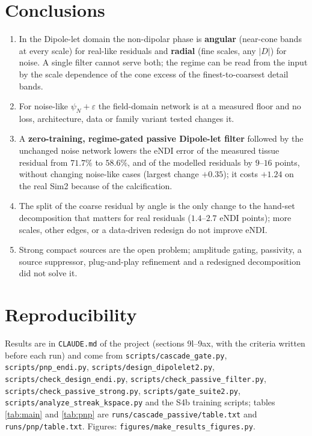 \documentclass[11pt]{article}
\newcommand{\abs}[1]{\lvert #1\rvert}
\newcommand{\code}[1]{\texttt{#1}}
\begin{document}
\section{Conclusions}
\begin{enumerate}[leftmargin=1.5em,itemsep=2pt]
\item In the Dipole-let domain the non-dipolar phase is \textbf{angular} (near-cone bands at every scale) for real-like residuals and \textbf{radial} (fine scales, any $\abs D$) for noise. A single filter cannot serve both; the regime can be read from the input by the scale dependence of the cone excess of the finest-to-coarsest detail bands.
\item For noise-like $\psi_N+\varepsilon$ the field-domain network is at a measured floor and no loss, architecture, data or family variant tested changes it.
\item A \textbf{zero-training, regime-gated passive Dipole-let filter} followed by the unchanged noise network lowers the eNDI error of the measured tissue residual from $71.7\%$ to $58.6\%$, and of the modelled residuals by $9$--$16$ points, without changing noise-like cases (largest change $+0.35$); it costs $+1.24$ on the real Sim2 because of the calcification.
\item The split of the coarse residual by angle is the only change to the hand-set decomposition that matters for real residuals ($1.4$--$2.7$ eNDI points); more scales, other edges, or a data-driven redesign do not improve eNDI.
\item Strong compact sources are the open problem; amplitude gating, passivity, a source suppressor, plug-and-play refinement and a redesigned decomposition did not solve it.
\end{enumerate}

\section*{Reproducibility}\sloppy
Results are in \code{CLAUDE.md} of the project (sections 9l--9ax, with the criteria written before each run) and come from \code{scripts/cascade\_gate.py}, \code{scripts/pnp\_endi.py}, \code{scripts/design\_dipolelet2.py}, \code{scripts/check\_design\_endi.py}, \code{scripts/check\_passive\_filter.py}, \code{scripts/check\_passive\_strong.py}, \code{scripts/gate\_suite2.py}, \code{scripts/analyze\_streak\_kspace.py} and the S4b training scripts; tables \ref{tab:main} and \ref{tab:pnp} are \code{runs/cascade\_passive/table.txt} and \code{runs/pnp/table.txt}. Figures: \code{figures/make\_results\_figures.py}.
\end{document}
